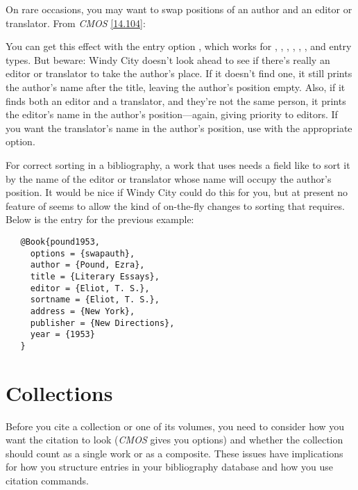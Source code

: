 \documentclass[11pt,letterpaper,oneside]{article}
\begin{document}
On rare occasions, you may want to swap positions of an author and an
editor or translator. From \textit{CMOS} \ref{14.104}:

\begin{citebib}
\item \cite{pound1953}
\end{citebib}

\noindent You can get this effect with the entry option
, which works for , ,
, , ,
, and  entry types. But beware:
Windy City doesn't look ahead to see if there's really an editor or
translator to take the author's place. If it doesn't find one, it
still prints the author's name after the title, leaving the author's
position empty. Also, if it finds both an editor and a translator, and
they're not the same person, it prints the editor's name in the
author's position---again, giving priority to editors. If you want the
translator's name in the author's position, use  with
the appropriate  option.

For correct sorting in a bibliography, a work that uses 
needs a field like  to sort it by the name of the
editor or translator whose name will occupy the author's position. It
would be nice if Windy City could do this for you, but at present no
feature of \biblatex seems to allow the kind of on-the-fly changes to
sorting that  requires. Below is the entry for the
previous example:

\begin{verbatim}
   @Book{pound1953,
     options = {swapauth},
     author = {Pound, Ezra},
     title = {Literary Essays},
     editor = {Eliot, T. S.},
     sortname = {Eliot, T. S.},
     address = {New York},
     publisher = {New Directions},
     year = {1953}
   }
\end{verbatim}

\section{Collections}
\label{collections}

Before you cite a collection or one of its volumes, you need to
consider how you want the citation to look (\textit{CMOS} gives you
options) and whether the collection should count as a single work or
as a composite. These issues have implications for how you structure
entries in your bibliography database and how you use citation
commands.
\end{document}
